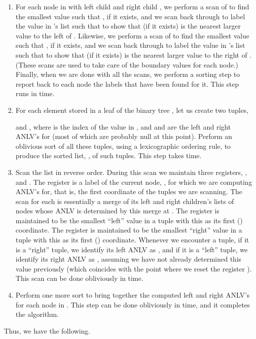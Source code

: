 \documentclass[11pt]{article}
\begin{document}
{\begin{enumerate}
rooted at 's left and right children,  and , producing lists, 
and , of labeled descendents of  and .
Then, we scan  to assign
 for each  such that  and  was previously null. 
Also, we scan  list to assign
 for each  such that  and  was previously null. 
We then concatenate these two lists of labeled nodes (some of which are still
null) to create the list  for , which is passed up to 's parent.
This step runs in  time.
\item
For each node  in  with left child  and right child ,
we perform a scan of  to find the smallest 
value  such that , if it exists, and we scan back through
 to label the value  in 's list such that 
to show that  (if it exists)
is the nearest larger value to the left of .
Likewise,
we perform a scan of  to find the smallest 
value  such that , if it exists, and we scan back through
 to label the value  in 's list such that 
to show that  (if it exists)
is the nearest larger value to the right of .
(These scans are used to take care of the boundary values for each node.)
Finally, when we are done with all the scans, we perform a sorting 
step to report back to each node the labels that have been found for it.
This step runs in  time.
\item
For each element  stored in a leaf of the binary tree , 
let us create two tuples, 
 
and
,
where  is the index of the value  in , and  and  are
the left and right ANLV's for  (most of which are
probably null at this point).
Perform an oblivious sort of all these tuples, using a lexicographic
ordering rule, to produce the sorted list, , of such tuples.
This step takes  time.
\item
Scan the list  in reverse order. During this scan we 
maintain three registers,
,  and . The register  is a label of the current node, , for
which we are computing ANLV's for, that is, the first coordinate of the
tuples we are scanning.
The scan for each  is essentially a merge of its left and right children's
lists of nodes whose ANLV is determined by this merge at .
The register  is maintained to be
the smallest ``left'' value in a tuple with this  as
its first () coordinate.
The register  is maintained to be
the smallest ``right'' value in a tuple with this  as
its first () coordinate.
Whenever we encounter a tuple, if it is a ``right'' tuple, we identify 
its left ANLV as , and if it is a ``left'' tuple, we identify
its right ANLV as , assuming we have not already determined this value
previously (which coincides with the point where we reset the register ).
This scan can be done obliviously in  time.
\item
Perform one more sort to bring together the computed 
left and right ANLV's for each node  in .
This step can be done obliviously in  time, and it completes the
algorithm.
\end{enumerate}
Thus, we have the following.

}
\end{document}
